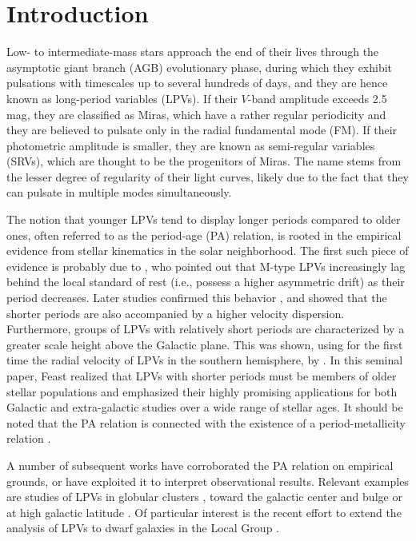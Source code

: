 \documentclass[letter]{aa}
\begin{document}
\section{Introduction}
\label{sec:Introduction}

Low- to intermediate-mass stars approach the end of their lives through the asymptotic giant branch (AGB) evolutionary phase, during which they exhibit pulsations with timescales up to several hundreds of days, and they are hence known as long-period variables (LPVs). If their $V$-band amplitude exceeds 2.5 mag, they are classified as Miras, which have a rather regular periodicity and they are believed to pulsate only in the radial fundamental mode (FM). If their photometric amplitude is smaller, they are known as semi-regular variables (SRVs), which are thought to be the progenitors of Miras. The name stems from the lesser degree of regularity of their light curves, likely due to the fact that they can pulsate in multiple modes simultaneously.

The notion that younger LPVs tend to display longer periods compared to older ones, often referred to as the period-age (PA) relation, is rooted in the empirical evidence from stellar kinematics in the solar neighborhood. The first such piece of evidence is probably due to \citet{Merrill_1923}, who pointed out that M-type LPVs increasingly lag behind the local standard of rest (i.e., possess a higher asymmetric drift) as their period decreases. Later studies \citep[as summarized by][]{WyattCahn_1983} confirmed this behavior \citep[also using proper motion data, e.g.,][]{WilsonMerrill_1942}, and showed that the shorter periods are also accompanied by a higher velocity dispersion. Furthermore, groups of LPVs with relatively short periods are characterized by a greater scale height above the Galactic plane. This was shown, using for the first time the radial velocity of LPVs in the southern hemisphere, by \citet{Feast_1963}. In this seminal paper, Feast realized that LPVs with shorter periods must be members of older stellar populations and emphasized their highly promising applications for both Galactic and extra-galactic studies over a wide range of stellar ages. It should be noted that the PA relation is connected with the existence of a period-metallicity relation \citep[][and references therein]{LloydEvansMenzies_1973,LloydEvans_1983b,Feast_1981,FeastWhitelock_2000b}.

A number of subsequent works have corroborated the PA relation on empirical grounds, or have exploited it to interpret observational results. Relevant examples are studies of LPVs in globular clusters \citep[e.g.,][]{Feast_1966,LloydEvans_1983b,Whitelock_1986}, toward the galactic center and bulge \citep[][]{LloydEvans_1976,Feast_etal_1980,Whitelock_etal_1991} or at high galactic latitude \citep{JuraKleinmann_1992_Mira,Whitelock_etal_1994}. Of particular interest is the recent effort to extend the analysis of LPVs to dwarf galaxies in the Local Group \citep{Menzies_etal_2002,Menzies_etal_2008,Whitelock_etal_2009,Menzies_etal_2010,Menzies_etal_2011,Sakamoto_etal_2012,BattinelliDemers_2012,BattinelliDemers_2013,Whitelock_etal_2013,Menzies_etal_2015}.
\end{document}
